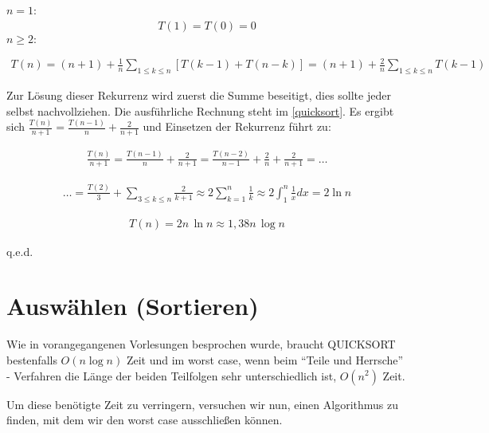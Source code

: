 \begin{beweis}
$n=1$:
\begin{gather*}
T(1)=T(0)=0
\end{gather*}
$n \geq 2:$

\begin{gather*}
T(n)=(n+1)+ \frac{1}{n}\sum_{1\leq k\leq n}[T(k-1)+ T(n-k)]= (n+1)+ \frac{2}{n} \sum_{1\leq k\leq n}T(k-1)
\end{gather*}

Zur Lösung dieser Rekurrenz wird zuerst die Summe beseitigt, dies sollte jeder selbst nachvollziehen.
Die ausführliche Rechnung steht im \autoref{quicksort}. Es ergibt sich \(\frac{T(n)}{n+1}= \frac{T(n-1)}{n}+ \frac{2}{n+1}\) und
Einsetzen der Rekurrenz führt zu:


\begin{gather*}
\frac{T(n)}{n+1}= \frac{T(n-1)}{n}+ \frac{2}{n+1}=\frac{T(n-2)}{n-1}+\frac{2}{n}+\frac{2}{n+1}=\ldots
\end{gather*}

\begin{gather*}
\ldots= \frac{T(2)}{3}+ \sum_{3\leq k \leq n}\frac{2}{k+1} \approx 2\sum_{k=1}^{n}\frac{1}{k}\approx 2
\int_{1}^{n}\frac{1}{x} dx =2 \ln n
\end{gather*}

\begin{gather*}
T(n)=2n\, \ln n \approx 1,38 n \, \log n
\end{gather*}
\end{beweis}
\hfill q.e.d.
%
 \section{Auswählen (Sortieren)}
 Wie in vorangegangenen Vorlesungen besprochen wurde, braucht \textsc{QUICKSORT} bestenfalls $O(n \log n)$ Zeit und im
 worst case, wenn beim "`Teile und Herrsche"' - Verfahren die Länge der beiden Teilfolgen sehr unterschiedlich ist, $O(n^{2})$ Zeit.

 Um diese benötigte Zeit zu verringern, versuchen wir nun, einen Algorithmus zu finden, mit dem wir den worst case ausschließen
 können.

